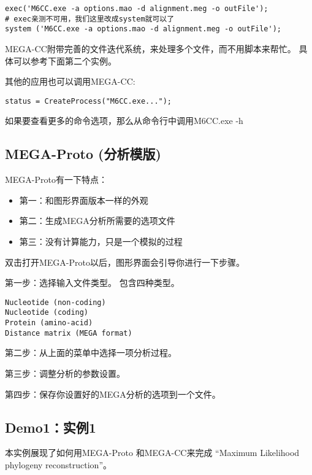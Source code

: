 \documentclass{ctexart}
\begin{document}
\lstset{frame=single,frameround=tttt,language=Perl}
\begin{lstlisting}
exec('M6CC.exe -a options.mao -d alignment.meg -o outFile'); 
# exec亲测不可用，我们这里改成system就可以了
system ('M6CC.exe -a options.mao -d alignment.meg -o outFile');
\end{lstlisting}
MEGA-CC附带完善的文件迭代系统，来处理多个文件，而不用脚本来帮忙。
具体可以参考下面第二个实例。

其他的应用也可以调用MEGA-CC:

\lstset{frame=single,frameround=tttt,language=Perl}
\begin{lstlisting}
status = CreateProcess("M6CC.exe...");
\end{lstlisting}
如果要查看更多的命令选项，那么从命令行中调用M6CC.exe -h
\subsection{MEGA-Proto (分析模版)}
\label{sec-3-5}

MEGA-Proto有一下特点：
\begin{itemize}
\item 第一：和图形界面版本一样的外观
\item 第二：生成MEGA分析所需要的选项文件
\item 第三：没有计算能力，只是一个模拟的过程
\end{itemize}
双击打开MEGA-Proto以后，图形界面会引导你进行一下步骤。

第一步：选择输入文件类型。
包含四种类型。

\lstset{frame=single,frameround=tttt,language=Perl}
\begin{lstlisting}
Nucleotide (non-coding)
Nucleotide (coding)
Protein (amino-acid)
Distance matrix (MEGA format)
\end{lstlisting}

第二步：从上面的菜单中选择一项分析过程。

第三步：调整分析的参数设置。

第四步：保存你设置好的MEGA分析的选项到一个文件。
\subsection{Demo1：实例1}
\label{sec-3-6}

本实例展现了如何用MEGA-Proto 和MEGA-CC来完成
“Maximum Likelihood phylogeny reconstruction”。
\end{document}
